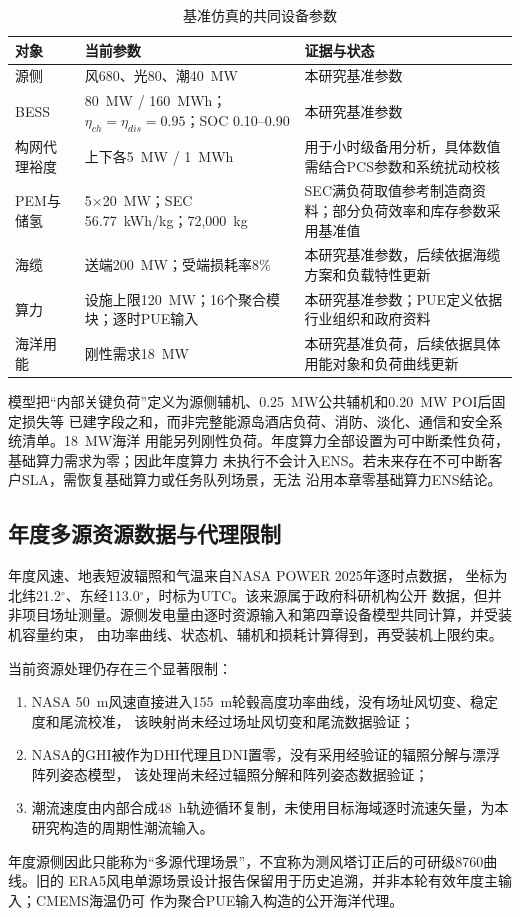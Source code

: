 \begin{table}[htbp]
\centering
\caption{基准仿真的共同设备参数}
\label{tab:c5-common-config}
\begin{tabularx}{\textwidth}{p{2.5cm}p{4.0cm}X}
\toprule
对象 & 当前参数 & 证据与状态\\
\midrule
源侧 & 风680、光80、潮40~MW & 本研究基准参数\\
BESS & 80~MW / 160~MWh；$\eta_{ch}=\eta_{dis}=0.95$；SOC 0.10--0.90 & 本研究基准参数\\
构网代理裕度 & 上下各5~MW / 1~MWh & 用于小时级备用分析，具体数值需结合PCS参数和系统扰动校核\\
PEM与储氢 & 5$\times$20~MW；SEC 56.77~kWh/kg；72,000~kg & SEC满负荷取值参考制造商资料；部分负荷效率和库存参数采用基准值\\
海缆 & 送端200~MW；受端损耗率8\% & 本研究基准参数，后续依据海缆方案和负载特性更新\\
算力 & 设施上限120~MW；16个聚合模块；逐时PUE输入 & 本研究基准参数；PUE定义依据行业组织和政府资料\cite{green-grid-pue,doe-pue}\\
海洋用能 & 刚性需求18~MW & 本研究基准负荷，后续依据具体用能对象和负荷曲线更新\\
\bottomrule
\end{tabularx}
\end{table}

模型把“内部关键负荷”定义为源侧辅机、0.25~MW公共辅机和0.20~MW POI后固定损失等
已建字段之和，而非完整能源岛酒店负荷、消防、淡化、通信和安全系统清单。18~MW海洋
用能另列刚性负荷。年度算力全部设置为可中断柔性负荷，基础算力需求为零；因此年度算力
未执行不会计入ENS。若未来存在不可中断客户SLA，需恢复基础算力或任务队列场景，无法
沿用本章零基础算力ENS结论。

\subsection{年度多源资源数据与代理限制}

年度风速、地表短波辐照和气温来自NASA POWER 2025年逐时点数据\cite{nasa-power}，
坐标为北纬21.2$^{\circ}$、东经113.0$^{\circ}$，时标为UTC。该来源属于政府科研机构公开
数据，但并非项目场址测量。源侧发电量由逐时资源输入和第四章设备模型共同计算，并受装机容量约束，
由功率曲线、状态机、辅机和损耗计算得到，再受装机上限约束。

当前资源处理仍存在三个显著限制：
\begin{enumerate}[label=(\arabic*)]
\item NASA 50~m风速直接进入155~m轮毂高度功率曲线，没有场址风切变、稳定度和尾流校准，
      该映射尚未经过场址风切变和尾流数据验证；
\item NASA的GHI被作为DHI代理且DNI置零，没有采用经验证的辐照分解与漂浮阵列姿态模型，
      该处理尚未经过辐照分解和阵列姿态数据验证；
\item 潮流速度由内部合成48~h轨迹循环复制，未使用目标海域逐时流速矢量，为本研究构造的周期性潮流输入。
\end{enumerate}
年度源侧因此只能称为“多源代理场景”，不宜称为测风塔订正后的可研级8760曲线。旧的
ERA5风电单源场景设计报告保留用于历史追溯，并非本轮有效年度主输入；CMEMS海温仍可
作为聚合PUE输入构造的公开海洋代理。

